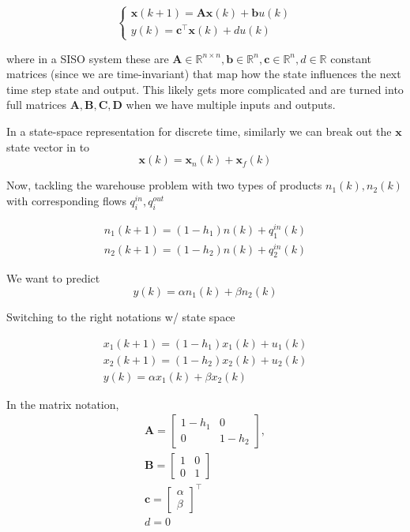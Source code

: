 \documentclass[11pt]{article}
\begin{document}
\begin{equation}
  \begin{cases}
    \textbf{x}(k + 1) = \textbf{A} \textbf{x} (k) + \textbf{b} u(k) \\
    y(k) = \textbf{c}^\top \textbf{x} (k) + d u(k)
  \end{cases}
\end{equation}

where in a SISO system these are  $\textbf{A} \in \mathbb{R}^{n \times n}, \textbf{b} \in \mathbb{R}^n, \textbf{c} \in \mathbb{R}^n, d \in \mathbb{R}$ constant matrices (since we are time-invariant) that map how the state influences the next time step state and output.
This likely gets more complicated and are turned into full matrices $\textbf{A}, \textbf{B}, \textbf{C}, \textbf{D}$ when we have multiple inputs and outputs.

In a state-space representation for discrete time, similarly we can break out the $\textbf{x}$ state vector in to 
\begin{equation}
  \textbf{x} (k) = \textbf{x}_n (k) + \textbf{x}_f (k)
\end{equation}

Now, tackling the warehouse problem with two types of products $n_1(k), n_2(k)$ with corresponding flows $q_i^{in}, q_i^{out}$

\begin{gather}
  n_1 (k +1) = (1-h_1) n(k) + q_1^{in}(k) \\
  n_2 (k +1) = (1-h_2) n(k) + q_2^{in}(k) 
\end{gather}

We want to predict 
\begin{equation}
  y(k) = \alpha n_1(k) + \beta n_2(k)
\end{equation}

Switching to the right notations w/ state space

\begin{gather}
  x_1 (k +1) = (1-h_1) x_1(k) + u_1(k) \\
  x_2 (k +1) = (1-h_2) x_2(k) + u_2(k) \\ 
  y(k) = \alpha x_1(k) + \beta x_2(k)
\end{gather}

In the matrix notation, 
\begin{align}
  \textbf{A} =
  \begin{bmatrix}
     1 -h_1 & 0 \\ 0 & 1-h_2
  \end{bmatrix},
  \\
  \textbf{B} = 
  \begin{bmatrix}
    1 & 0\\ 0 & 1
  \end{bmatrix}
  \\
  \textbf{c} = 
  \begin{bmatrix}
    \alpha \\ \beta
  \end{bmatrix}^\top
  \\
  d = 0
\end{align}
\end{document}
